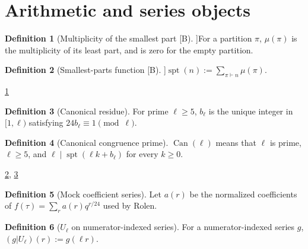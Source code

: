 \documentclass[11pt,a4paper]{article}
\numberwithin{equation}{section}
\theoremstyle{plain}\newtheorem{theorem}{Theorem}[section]\newaliascnt{proposition}{theorem}\newtheorem{proposition}[proposition]{Proposition}\aliascntresetthe{proposition}\newaliascnt{lemma}{theorem}\newtheorem{lemma}[lemma]{Lemma}\aliascntresetthe{lemma}
\theoremstyle{definition}\newaliascnt{definition}{theorem}\newtheorem{definition}[definition]{Definition}\aliascntresetthe{definition}\newaliascnt{notation}{theorem}\newtheorem{notation}[notation]{Notation}\aliascntresetthe{notation}
\providecommand{\lean}[1]{}\providecommand{\leanok}{}
\newcommand{\spt}{\operatorname{spt}}\newcommand{\Can}{\operatorname{Can}}\newcommand{\Wr}{\operatorname{Wr}}\newcommand{\Adm}{\operatorname{Adm}}\newcommand{\CT}{\operatorname{CT}}\newcommand{\F}{\mathbb F}\newcommand{\Z}{\mathbb Z}\newcommand{\Q}{\mathbb Q}
\begin{document}
\section{Arithmetic and series objects}
\begin{definition}[Multiplicity of the smallest part [B]]\label{def_smallest_multiplicity}\lean{SptCM.smallestPartMultiplicity}\leanok
For a partition $\pi$, $\mu(\pi)$ is the multiplicity of its least part, and is zero for the empty partition.
\end{definition}
\begin{definition}[Smallest-parts function [B]]\label{def_spt}\lean{SptCM.spt}\leanok
$\spt(n):=\sum_{\pi\vdash n}\mu(\pi)$.
\end{definition}
\begin{uses-statement}\ref{def_smallest_multiplicity}\end{uses-statement}
\begin{definition}[Canonical residue]\label{def_canonical_shift}\lean{SptCM.canonicalResidue}\leanok
For prime $\ell\ge5$, $b_\ell$ is the unique integer in $[1,\ell)$ satisfying $24b_\ell\equiv1\pmod\ell$.
\end{definition}
\begin{definition}[Canonical congruence prime]\label{def_canonical}\lean{SptCM.CanonicalCongruencePrime}\leanok
$\Can(\ell)$ means that $\ell$ is prime, $\ell\ge5$, and $\ell\mid\spt(\ell k+b_\ell)$ for every $k\ge0$.
\end{definition}
\begin{uses-statement}\ref{def_spt}, \ref{def_canonical_shift}\end{uses-statement}
\begin{definition}[Mock coefficient series]\label{def_series_f}\lean{SptCM.Analytic.fSeries}\leanok
Let $a(r)$ be the normalized coefficients of $f(\tau)=\sum_r a(r)q^{r/24}$ used by Rolen.
\end{definition}
\begin{definition}[$U_\ell$ on numerator-indexed series]\label{def_u_operator}\lean{SptCM.Analytic.uSeriesOp}\leanok
For a numerator-indexed series $g$, $(g|U_\ell)(r):=g(\ell r)$.
\end{definition}
\end{document}
